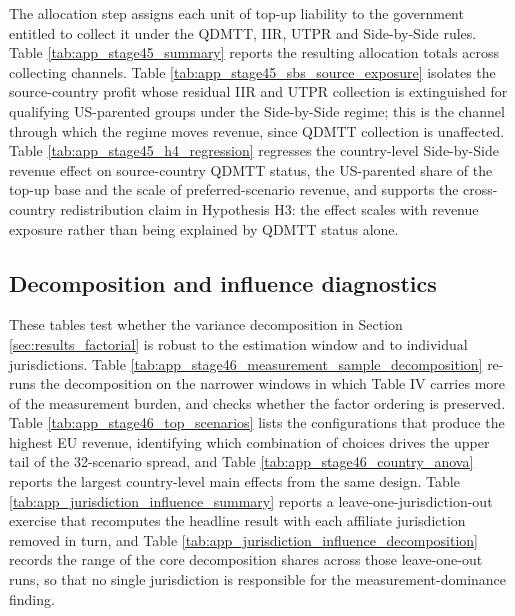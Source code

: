 \documentclass[11pt,a4paper]{article}
\begin{document}
The allocation step assigns each unit of top-up liability to the government entitled to collect it under the QDMTT, IIR, UTPR and Side-by-Side rules. Table \ref{tab:app_stage45_summary} reports the resulting allocation totals across collecting channels. Table \ref{tab:app_stage45_sbs_source_exposure} isolates the source-country profit whose residual IIR and UTPR collection is extinguished for qualifying US-parented groups under the Side-by-Side regime; this is the channel through which the regime moves revenue, since QDMTT collection is unaffected. Table \ref{tab:app_stage45_h4_regression} regresses the country-level Side-by-Side revenue effect on source-country QDMTT status, the US-parented share of the top-up base and the scale of preferred-scenario revenue, and supports the cross-country redistribution claim in Hypothesis H3: the effect scales with revenue exposure rather than being explained by QDMTT status alone.





\subsection{Decomposition and influence diagnostics}\label{app:results_stage46}

These tables test whether the variance decomposition in Section \ref{sec:results_factorial} is robust to the estimation window and to individual jurisdictions. Table \ref{tab:app_stage46_measurement_sample_decomposition} re-runs the decomposition on the narrower windows in which Table IV carries more of the measurement burden, and checks whether the factor ordering is preserved. Table \ref{tab:app_stage46_top_scenarios} lists the configurations that produce the highest EU revenue, identifying which combination of choices drives the upper tail of the 32-scenario spread, and Table \ref{tab:app_stage46_country_anova} reports the largest country-level main effects from the same design. Table \ref{tab:app_jurisdiction_influence_summary} reports a leave-one-jurisdiction-out exercise that recomputes the headline result with each affiliate jurisdiction removed in turn, and Table \ref{tab:app_jurisdiction_influence_decomposition} records the range of the core decomposition shares across those leave-one-out runs, so that no single jurisdiction is responsible for the measurement-dominance finding.
\end{document}
